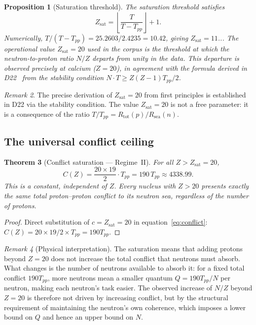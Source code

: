 \documentclass{article}
\newtheorem{theorem}{Theorem}[section]
\newtheorem{proposition}[theorem]{Proposition}
\theoremstyle{remark}
\newtheorem{remark}[theorem]{Remark}
\newcommand{\Rsea}{R_{\mathrm{sea}}}
\newcommand{\Rtot}{R_{\mathrm{tot}}}
\newcommand{\Tpp}{T_{pp}}
\newcommand{\Zsat}{Z_{\mathrm{sat}}}
\begin{document}
\begin{proposition}[Saturation threshold]
\label{prop:zsat}
The saturation threshold satisfies
\begin{equation}
  \Zsat = \left\lfloor \frac{T}{T - \Tpp} \right\rfloor + 1.
  \label{eq:zsat}
\end{equation}
Numerically, $T/(T-\Tpp) = 25.2603/2.4235 = 10.42$, giving $\Zsat = 11$... The operational value $\Zsat = 20$ used in the corpus is the threshold at which the neutron-to-proton ratio $N/Z$ departs from unity in the data. This departure is observed precisely at calcium ($Z=20$), in agreement with the formula derived in D22~\cite{D22} from the stability condition $N \cdot T \geq Z(Z-1)\Tpp/2$.
\end{proposition}

\begin{remark}
The precise derivation of $\Zsat = 20$ from first principles is established in D22 via the stability condition. The value $\Zsat = 20$ is not a free parameter: it is a consequence of the ratio $T/\Tpp = \Rtot(p)/\Rsea(n)$.
\end{remark}

\subsection{The universal conflict ceiling}

\begin{theorem}[Conflict saturation --- Regime~II]
\label{thm:saturation}
For all $Z > \Zsat = 20$,
\begin{equation}
  C(Z) = \frac{20 \times 19}{2} \cdot \Tpp = 190\,\Tpp \approx 4338.99.
  \label{eq:saturation}
\end{equation}
This is a constant, independent of $Z$. Every nucleus with $Z > 20$ presents exactly the same total proton--proton conflict to its neutron sea, regardless of the number of protons.
\end{theorem}

\begin{proof}
Direct substitution of $c = \Zsat = 20$ in equation~\eqref{eq:conflict}: $C(Z) = 20 \times 19/2 \times \Tpp = 190\Tpp$.
\end{proof}

\begin{remark}[Physical interpretation]
The saturation means that adding protons beyond $Z = 20$ does not increase the total conflict that neutrons must absorb. What changes is the number of neutrons available to absorb it: for a fixed total conflict $190\Tpp$, more neutrons mean a smaller quantum $Q = 190\Tpp/N$ per neutron, making each neutron's task easier. The observed increase of $N/Z$ beyond $Z = 20$ is therefore not driven by increasing conflict, but by the structural requirement of maintaining the neutron's own coherence, which imposes a lower bound on $Q$ and hence an upper bound on $N$.
\end{remark}
\end{document}
